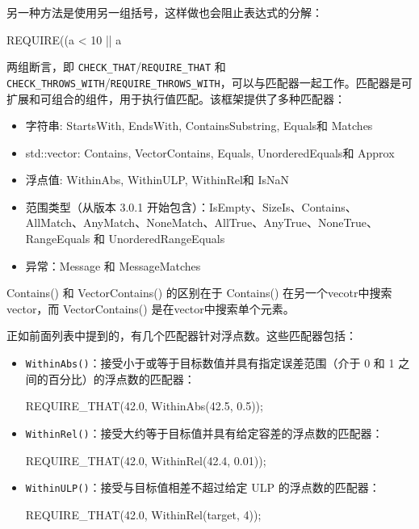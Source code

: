 另一种方法是使用另一组括号，这样做也会阻止表达式的分解：

\begin{cpp}
REQUIRE((a < 10 || a %
\end{cpp}

两组断言，即 \verb|CHECK_THAT|/\verb|REQUIRE_THAT| 和 \verb|CHECK_THROWS_WITH|/\verb|REQUIRE_THROWS_WITH|，可以与匹配器一起工作。匹配器是可扩展和可组合的组件，用于执行值匹配。该框架提供了多种匹配器：

\begin{itemize}
\item
字符串: StartsWith, EndsWith, ContainsSubstring, Equals和 Matches

\item
std::vector: Contains, VectorContains, Equals, UnorderedEquals和 Approx

\item
浮点值: WithinAbs, WithinULP, WithinRel和 IsNaN

\item
范围类型（从版本 3.0.1 开始包含）：IsEmpty、SizeIs、Contains、AllMatch、AnyMatch、NoneMatch、AllTrue、AnyTrue、NoneTrue、RangeEquals 和 UnorderedRangeEquals

\item
异常：Message 和 MessageMatches
\end{itemize}

\begin{myTip}
Contains() 和 VectorContains() 的区别在于 Contains() 在另一个vecotr中搜索vector，而 VectorContains() 是在vector中搜索单个元素。
\end{myTip}

正如前面列表中提到的，有几个匹配器针对浮点数。这些匹配器包括：

\begin{itemize}
\item
\verb|WithinAbs()|：接受小于或等于目标数值并具有指定误差范围（介于 0 和 1 之间的百分比）的浮点数的匹配器：

\begin{cpp}
REQUIRE_THAT(42.0, WithinAbs(42.5, 0.5));
\end{cpp}

\item
\verb|WithinRel()|：接受大约等于目标值并具有给定容差的浮点数的匹配器：

\begin{cpp}
REQUIRE_THAT(42.0, WithinRel(42.4, 0.01));
\end{cpp}

\item
\verb|WithinULP()|：接受与目标值相差不超过给定 ULP 的浮点数的匹配器：

\begin{cpp}
REQUIRE_THAT(42.0, WithinRel(target, 4));
\end{cpp}

\end{itemize}

